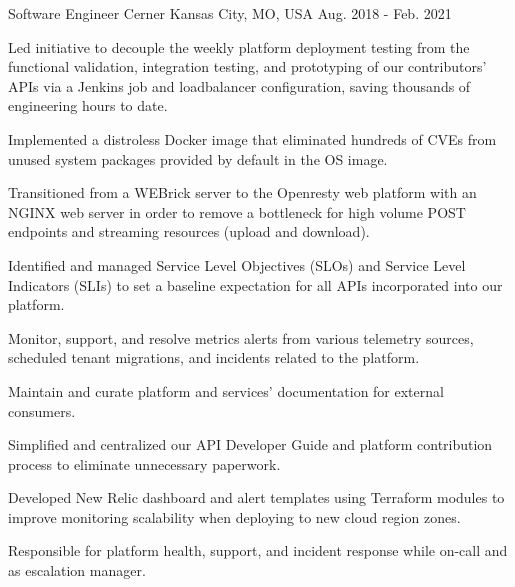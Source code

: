 \begin{cventries}
  \cventry
  {Software Engineer} %
  {Cerner} %
  {Kansas City, MO, USA} %
  {Aug. 2018 - Feb. 2021} %
  {
    \begin{cvitems} %
      \item {Led initiative to decouple the weekly platform deployment testing from the functional validation, integration testing, and prototyping of our contributors' APIs via a Jenkins job and loadbalancer configuration, saving thousands of engineering hours to date.}
      \item {Implemented a distroless Docker image that eliminated hundreds of CVEs from unused system packages provided by default in the OS image.}
      \item {Transitioned from a WEBrick server to the Openresty web platform with an NGINX web server in order to remove a bottleneck for high volume POST endpoints and streaming resources (upload and download).}
      \item {Identified and managed Service Level Objectives (SLOs) and Service Level Indicators (SLIs) to set a baseline expectation for all APIs incorporated into our platform.}
      \item {Monitor, support, and resolve metrics alerts from various telemetry sources, scheduled tenant migrations, and incidents related to the platform.}
      \item {Maintain and curate platform and services' documentation for external consumers.}
      \item {Simplified and centralized our API Developer Guide and platform contribution process to eliminate unnecessary paperwork.}
      \item {Developed New Relic dashboard and alert templates using Terraform modules to improve monitoring scalability when deploying to new cloud region zones.}
      \item {Responsible for platform health, support, and incident response while on-call and as escalation manager.}
    \end{cvitems}
  }

\end{cventries}

